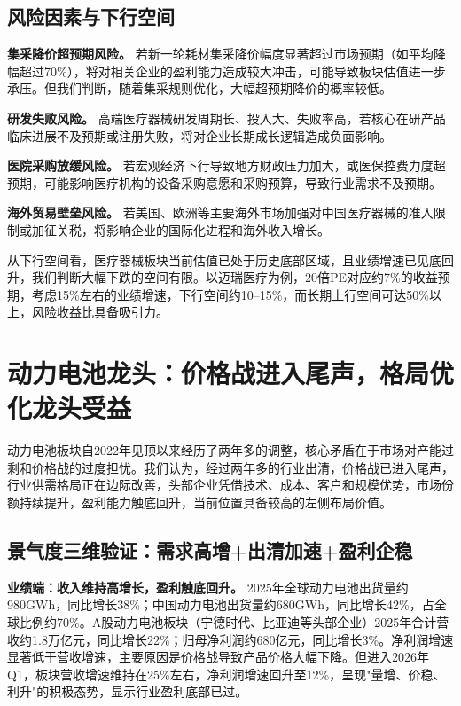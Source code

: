 \subsection{风险因素与下行空间}

\textbf{集采降价超预期风险。} 若新一轮耗材集采降价幅度显著超过市场预期（如平均降幅超过70\%），将对相关企业的盈利能力造成较大冲击，可能导致板块估值进一步承压。但我们判断，随着集采规则优化，大幅超预期降价的概率较低。

\textbf{研发失败风险。} 高端医疗器械研发周期长、投入大、失败率高，若核心在研产品临床进展不及预期或注册失败，将对企业长期成长逻辑造成负面影响。

\textbf{医院采购放缓风险。} 若宏观经济下行导致地方财政压力加大，或医保控费力度超预期，可能影响医疗机构的设备采购意愿和采购预算，导致行业需求不及预期。

\textbf{海外贸易壁垒风险。} 若美国、欧洲等主要海外市场加强对中国医疗器械的准入限制或加征关税，将影响企业的国际化进程和海外收入增长。

\vspace{0.2cm}

从下行空间看，医疗器械板块当前估值已处于历史底部区域，且业绩增速已见底回升，我们判断大幅下跌的空间有限。以迈瑞医疗为例，20倍PE对应约7\%的收益预期，考虑15\%左右的业绩增速，下行空间约10--15\%，而长期上行空间可达50\%以上，风险收益比具备吸引力。

\vspace{0.5cm}

\section{动力电池龙头：价格战进入尾声，格局优化龙头受益}

动力电池板块自2022年见顶以来经历了两年多的调整，核心矛盾在于市场对产能过剩和价格战的过度担忧。我们认为，经过两年多的行业出清，价格战已进入尾声，行业供需格局正在边际改善，头部企业凭借技术、成本、客户和规模优势，市场份额持续提升，盈利能力触底回升，当前位置具备较高的左侧布局价值。

\subsection{景气度三维验证：需求高增+出清加速+盈利企稳}

\textbf{业绩端：收入维持高增长，盈利触底回升。} 2025年全球动力电池出货量约980GWh，同比增长38\%；中国动力电池出货量约680GWh，同比增长42\%，占全球比例约70\%。A股动力电池板块（宁德时代、比亚迪等头部企业）2025年合计营收约1.8万亿元，同比增长22\%；归母净利润约680亿元，同比增长3\%。净利润增速显著低于营收增速，主要原因是价格战导致产品价格大幅下降。但进入2026年Q1，板块营收增速维持在25\%左右，净利润增速回升至12\%，呈现"量增、价稳、利升"的积极态势，显示行业盈利底部已过。

